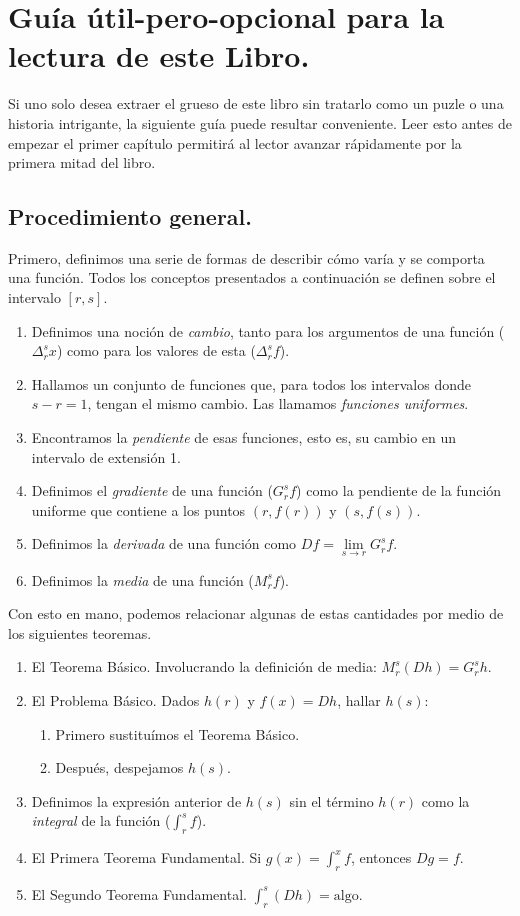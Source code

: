 \section{Guía útil-pero-opcional para la lectura de este Libro.}

Si uno solo desea extraer el grueso de este libro sin tratarlo como un puzle o una historia intrigante, la siguiente guía puede resultar conveniente. Leer esto antes de empezar el primer capítulo permitirá al lector avanzar rápidamente por la primera mitad del libro.

\subsection{Procedimiento general.}

Primero, definimos una serie de formas de describir cómo varía y se comporta una función. Todos los conceptos presentados a continuación se definen sobre el intervalo $[r, s]$.

\begin{enumerate}
	\item Definimos una noción de \textit{cambio}, tanto para los argumentos de una función ($\Delta_r^s x$) como para los valores de esta ($\Delta_r^s f$).
	\item Hallamos un conjunto de funciones que, para todos los intervalos donde $s - r = 1$, tengan el mismo cambio. Las llamamos \textit{funciones uniformes}.
	\item Encontramos la \textit{pendiente} de esas funciones, esto es, su cambio en un intervalo de extensión 1.
	\item Definimos el \textit{gradiente} de una función ($G_r^s f$) como la pendiente de la función uniforme que contiene a los puntos $(r, f(r))$ y $(s, f(s))$.
	\item Definimos la \textit{derivada} de una función como $Df = \lim\limits_{s\to r} G_r^s f$.
	\item Definimos la \textit{media} de una función ($M_r^s f$).	
\end{enumerate}

Con esto en mano, podemos relacionar algunas de estas cantidades por medio de los siguientes teoremas.

\begin{enumerate}
	\item El Teorema Básico. Involucrando la definición de media: $M_r^s (Dh) = G_r^s h$.
	\item El Problema Básico. Dados $h(r)$ y $f(x) = Dh$, hallar $h(s)$:
		\begin{enumerate}
			\item Primero sustituímos el Teorema Básico.
			\item Después, despejamos $h(s)$.
		\end{enumerate}
	\item Definimos la expresión anterior de $h(s)$ sin el término $h(r)$ como la \textit{integral} de la función ($\int_r^s f$).
	\item El Primera Teorema Fundamental. Si $g(x) = \int_r^x f$, entonces $Dg = f$.
	\item El Segundo Teorema Fundamental. $\int_r^s (Dh) = \textrm{algo}$.
\end{enumerate}

